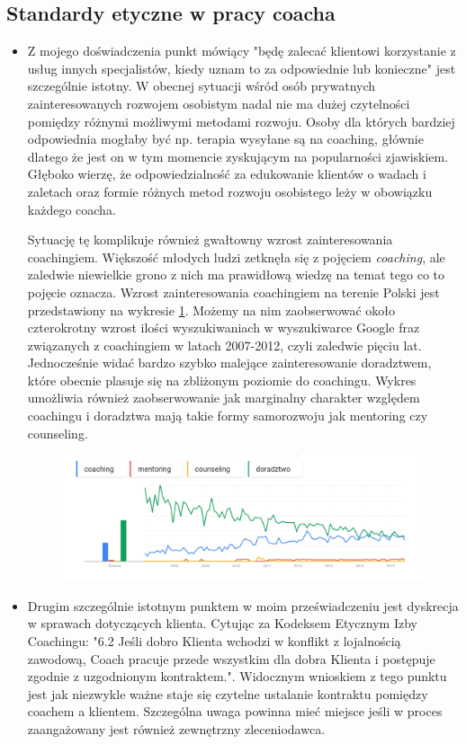 \subsection{Standardy etyczne w pracy coacha}
\begin{itemize}
  \item Z mojego doświadczenia punkt mówiący "będę zalecać klientowi korzystanie z usług innych specjalistów, kiedy uznam to za odpowiednie lub konieczne" jest szczególnie istotny.
      W obecnej sytuacji wśród osób prywatnych zainteresowanych rozwojem osobistym nadal nie ma dużej czytelności pomiędzy różnymi możliwymi metodami rozwoju.
      Osoby dla których bardziej odpowiednia mogłaby być np. terapia wysyłane są na coaching, głównie dlatego że jest on w tym momencie zyskującym na popularności zjawiskiem.
      Głęboko wierzę, że odpowiedzialność za edukowanie klientów o wadach i zaletach oraz formie różnych metod rozwoju osobistego leży w obowiązku każdego coacha.

      Sytuację tę komplikuje również gwałtowny wzrost zainteresowania coachingiem. Większość młodych ludzi zetknęła się z pojęciem \emph{coaching}, ale zaledwie niewielkie grono z nich
      ma prawidłową wiedzę na temat tego co to pojęcie oznacza. Wzrost zainteresowania coachingiem na terenie Polski jest przedstawiony na wykresie \ref{wykres}. Możemy na nim zaobserwować około czterokrotny wzrost
      ilości wyszukiwaniach w wyszukiwarce Google fraz związanych z coachingiem w latach 2007-2012, czyli zaledwie pięciu lat. Jednocześnie widać bardzo szybko malejące zainteresowanie doradztwem,
      które obecnie plasuje się na zbliżonym poziomie do coachingu. Wykres umożliwia również zaobserwowanie jak marginalny charakter względem coachingu i doradztwa mają takie formy samorozwoju
      jak mentoring czy counseling.

\begin{figure}[!ht]
  \centering
  \includegraphics[width=17cm]{img/popularnosc}
  \caption{}
  \label{wykres}
\end{figure}

  \item Drugim szczególnie istotnym punktem w moim przeświadczeniu jest dyskrecja w sprawach dotyczących klienta.
      Cytując za Kodeksem Etycznym Izby Coachingu: "6.2 Jeśli dobro Klienta wchodzi w konflikt z lojalnością zawodową, Coach pracuje przede wszystkim dla dobra Klienta i postępuje zgodnie z uzgodnionym kontraktem.". Widocznym wnioskiem z tego punktu jest jak niezwykle ważne staje się czytelne ustalanie kontraktu pomiędzy coachem a klientem. Szczególna uwaga powinna mieć miejsce jeśli w proces zaangażowany jest również zewnętrzny zleceniodawca.
\end{itemize}


